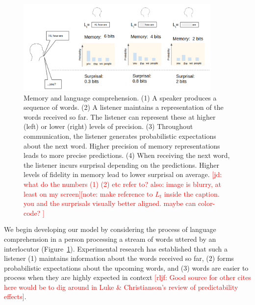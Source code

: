 \documentclass[12pt]{article}
\newcommand{\jd}[1]{\textcolor{Red}{[jd: #1]}}
\newcommand{\note}[1]{\textcolor{Red}{[note: #1]}}
\newcommand{\rljf}[1]{\textcolor{Red}{[rljf: #1]}}
\begin{document}
\begin{figure}
\centering
\includegraphics[width=0.9\textwidth]{figures-gdrive/communication.png}
	\caption{Memory and language comprehension. (1) A speaker produces a sequence of words. (2) A listener maintains a representation of the words received so far. The listener can represent these at higher (left) or lower (right) levels of precision. (3) Throughout communication, the listener generates probabilistic expectations about the next word. Higher precision of memory representations leads to more precise predictions. (4) When receiving the next word, the listener incurs surprisal depending on the predictions. Higher levels of fidelity in memory lead to lower surprisal on average. \jd{what do the numbers (1) (2) etc refer to? also: image is blurry, at least on my screen}\note{make reference to $L_t$ inside the caption. you and the surprisals visually better aligned. maybe can color-code? }}
	\label{fig:communication}
\end{figure}

We begin developing our model by considering the process of language comprehension in a person processing a stream of words uttered by an interlocutor (Figure~\ref{fig:communication}).
Experimental research has established that such a listener (1) maintains information about the words received so far, (2) forms probabilistic expectations about the upcoming words, and (3) words are easier to process when they are highly expected in context \citep{hale2001probabilistic,levy2008expectation} \rljf{Good source for other cites here would be to dig around in Luke \& Christianson's review of predictability effects}.
\end{document}
